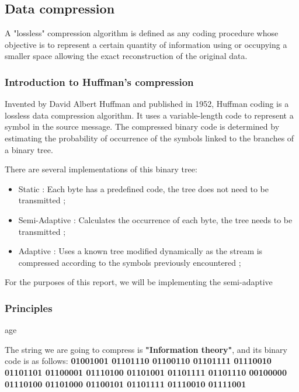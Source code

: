 \subsection{Data compression}

A "lossless" compression algorithm is defined as any coding procedure whose objective is to represent a certain quantity of information using or occupying a smaller space allowing the exact reconstruction of the original data.

\subsubsection{Introduction to Huffman's compression}

Invented by David Albert Huffman and published in 1952, Huffman coding is a lossless data compression algorithm. It uses a variable-length code to represent a symbol in the source message. The compressed binary code is determined by estimating the probability of occurrence of the symbols linked to the branches of a binary tree.

There are several implementations of this binary tree: \cite{wiki_huffman}

\begin{itemize}
 \item Static : Each byte has a predefined code, the tree does not need to be transmitted ;
 \item Semi-Adaptive : Calculates the occurrence of each byte, the tree needs to be transmitted ;
 \item Adaptive : Uses a known tree modified dynamically as the stream is compressed according to the symbols previously encountered ;
\end{itemize}

For the purposes of this report, we will be implementing the semi-adaptive

\subsubsection{Principles}age

The string we are going to compress is \textbf{"Information theory"}, and its binary code is as follows: \textbf{01001001 01101110 01100110 01101111 01110010 01101101 01100001 01110100 01101001 01101111 01101110 00100000 01110100 01101000 01100101 01101111 01110010 01111001}

